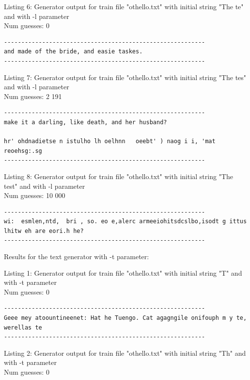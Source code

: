 \documentclass{article}
\begin{document}
Listing 6: Generator output for train file "othello.txt" with initial string "The te" and with -l parameter
\\Num guesses: 0

\begin{lstlisting}
----------------------------------------------------------
and made of the bride, and easie taskes.
----------------------------------------------------------
\end{lstlisting}

Listing 7: Generator output for train file "othello.txt" with initial string "The tes" and with -l parameter
\\Num guesses: 2 191

\begin{lstlisting}
----------------------------------------------------------
make it a darling, like death, and her husband?

hr' ohdnadietse n istulho lh oelhnn   oeebt' ) naog i i, 'mat reoehsg:.sg
----------------------------------------------------------
\end{lstlisting}

Listing 8: Generator output for train file "othello.txt" with initial string "The test" and with -l parameter
\\Num guesses: 10 000

\begin{lstlisting}
----------------------------------------------------------
wi:  esmlen,ntd,  bri , so. eo e,alerc armeeiohitsdcslbo,isodt g ittus lhitw eh are eori.h he?
----------------------------------------------------------
\end{lstlisting}



Results for the text generator with -t parameter:


\hfill

Listing 1: Generator output for train file "othello.txt" with initial string "T" and with -t parameter
\\Num guesses: 0

\begin{lstlisting}
----------------------------------------------------------
Geee mey atoountineenet: Hat he Tuengo. Cat agagngile onifouph m y te, werellas te
----------------------------------------------------------
\end{lstlisting}

Listing 2: Generator output for train file "othello.txt" with initial string "Th" and with -t parameter
\\Num guesses: 0
\end{document}
